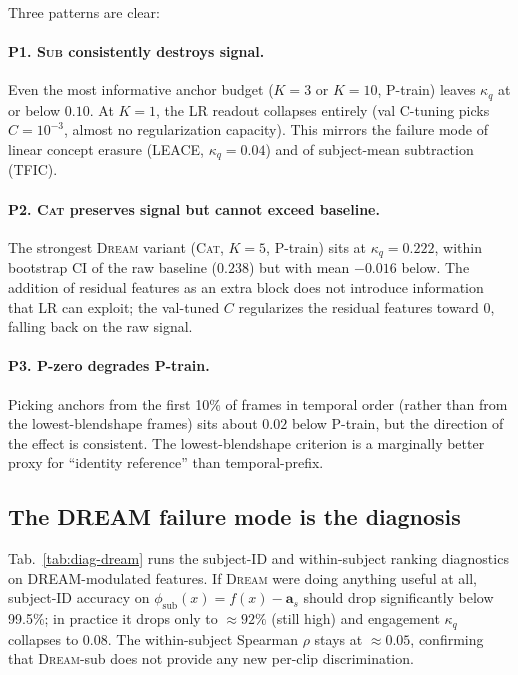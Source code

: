 Three patterns are clear:

\paragraph{P1. \textsc{Sub} consistently destroys signal.} Even the
most informative anchor budget ($K = 3$ or $K = 10$, P-train) leaves
$\kappa_q$ at or below $0.10$. At $K = 1$, the LR readout collapses
entirely (val C-tuning picks $C = 10^{-3}$, almost no regularization
capacity). This mirrors the failure mode of linear concept erasure
(LEACE, $\kappa_q = 0.04$) and of subject-mean subtraction (TFIC).

\paragraph{P2. \textsc{Cat} preserves signal but cannot exceed
baseline.} The strongest \textsc{Dream} variant (\textsc{Cat},
$K = 5$, P-train) sits at $\kappa_q = 0.222$, within bootstrap CI
of the raw baseline ($0.238$) but with mean $-0.016$ below. The
addition of residual features as an extra block does not introduce
information that LR can exploit; the val-tuned $C$ regularizes the
residual features toward $0$, falling back on the raw signal.

\paragraph{P3. P-zero degrades P-train.} Picking anchors from the
first 10\% of frames in temporal order (rather than from the
lowest-blendshape frames) sits about $0.02$ below P-train, but the
direction of the effect is consistent. The lowest-blendshape
criterion is a marginally better proxy for ``identity reference''
than temporal-prefix.

\subsection{The DREAM failure mode is the diagnosis}
\label{sec:dream-diagnosis}

Tab.~\ref{tab:diag-dream} runs the subject-ID and within-subject
ranking diagnostics on DREAM-modulated features. If \textsc{Dream}
were doing anything useful at all, subject-ID accuracy on
$\phi_{\mathrm{sub}}(x) = f(x) - \mathbf{a}_s$ should drop
significantly below 99.5\%; in practice it drops only to
$\approx 92\%$ (still high) and engagement $\kappa_q$ collapses
to $0.08$. The within-subject Spearman $\rho$ stays at $\approx 0.05$,
confirming that \textsc{Dream}-sub does not provide any new
per-clip discrimination.


